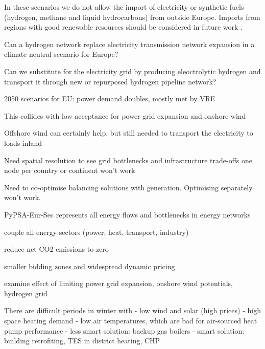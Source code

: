 In these scenarios we do not allow the import of electricity or synthetic fuels
(hydrogen, methane and liquid hydrocarbons) from outside Europe. Imports from
regions with good renewable resources should be considered in future work
\cite{fasihiTechnoeconomicAssessment2019,heuserTechnoeconomicAnalysis2019}.

Can a hydrogen network replace electricity transmission network expansion in a climate-neutral scenario for Europe?

Can we substitute for the electricity grid by producing eleoctrolytic hydrogen
and transport it through new or repurposed hydrogen pipeline network?

2050 scenarios for EU: power demand doubles, mostly met by VRE

This collides with low acceptance for power grid expansion and onshore wind

Offshore wind can certainly help, but still needed to transport the electricity to loads inland

Need spatial resolution to see grid bottlenecks and infrastructure trade-offs
one node per country or continent won't work

Need to co-optimise balancing solutions with generation. Optimising separately won't work.

PyPSA-Eur-Sec represents all energy flows and bottlenecks in energy networks

couple all energy sectors (power, heat, transport, industry)

reduce net CO2 emissions to zero

smaller bidding zones and widespread dynamic pricing

examine effect of limiting power grid expansion, onshore wind potentials, hydrogen grid

There are difficult periods in winter with
- low wind and solar (high prices)
- high space heating demand
- low air temperatures, which are bad for air-sourced heat pump performance
- less smart solution: backup gas boilers
- smart solution: building retrofiting, TES in district heating, CHP
